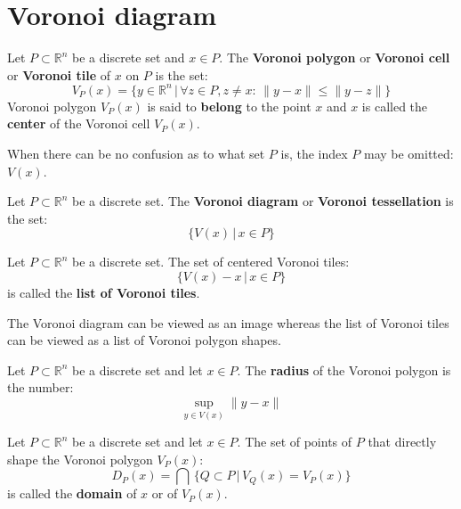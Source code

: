 \documentclass[text.tex]{subfiles}
\begin{document}
\section{Voronoi diagram}\label{sec_voronoi} %
\begin{definition}
Let $P\subset \mathbb{R}^n$ be a discrete set and $x\in P$. The \textbf{Voronoi polygon} or \textbf{Voronoi cell} or \textbf{Voronoi tile} of $x$ on $P$ is the set: 
$$V_P(x) = \{ y \in \mathbb{R}^n \,|\, \forall z \in P, z\neq x:\, \|y-x\|\leq\|y-z\| \}$$
Voronoi polygon $V_P(x)$ is said to \textbf{belong} to the point $x$ and $x$ is called the \textbf{center} of the Voronoi cell $V_P(x)$. 
\end{definition}

\begin{remark}
When there can be no confusion as to what set $P$ is, the index $P$ may be omitted: $V(x)$.
\end{remark}

\begin{definition}
Let $P\subset \mathbb{R}^n$ be a discrete set. The \textbf{Voronoi diagram} or \textbf{Voronoi tessellation} is the set: 
$$\{V(x)\,|\, x\in P\}$$
\end{definition}

\begin{definition}
Let $P\subset \mathbb{R}^n$ be a discrete set. The set of centered Voronoi tiles: 
$$\{V(x)-x\,|\, x\in P\}$$
is called the \textbf{list of Voronoi tiles}.
\end{definition}

\begin{remark}
The Voronoi diagram can be viewed as an image whereas the list of Voronoi tiles can be viewed as a list of Voronoi polygon shapes. 
\end{remark}

\begin{definition}
Let $P\subset \mathbb{R}^n$ be a discrete set and let $x\in P$. The \textbf{radius} of the Voronoi polygon is the number: 
$$\sup_{y\in V(x)}\lVert y-x\rVert$$
\end{definition}

\begin{definition}
Let $P\subset \mathbb{R}^n$ be a discrete set and let $x\in P$. The set of points of $P$ that directly shape the Voronoi polygon $V_P(x)$:
$$D_P(x) = \bigcap\, \big\{ Q\subset P\,|\, V_Q(x) = V_P(x) \big\}$$
is called the \textbf{domain} of $x$ or of $V_P(x)$. 
\end{definition}
\end{document}

